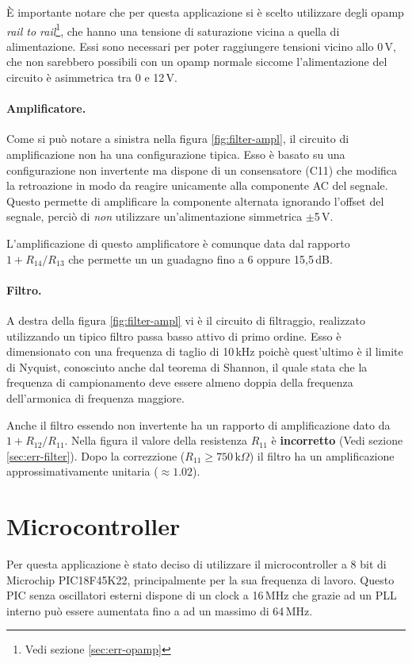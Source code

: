 \`E importante notare che per questa applicazione si \`e scelto utilizzare
degli opamp \emph{rail to rail}\footnote{Vedi sezione \ref{sec:err-opamp}},
che hanno una tensione di saturazione vicina a quella di alimentazione. Essi
sono necessari per poter raggiungere tensioni vicino allo 0\,V, che non
sarebbero possibili con un opamp normale siccome l'alimentazione del circuito
\`e asimmetrica tra 0 e 12\,V.

\paragraph{Amplificatore.} Come si pu\`o notare a sinistra nella figura
\ref{fig:filter-ampl}, il circuito di amplificazione non ha una configurazione
tipica. Esso \`e basato su una configurazione non invertente ma dispone di un
consensatore (C11) che modifica la retroazione in modo da reagire unicamente
alla componente AC del segnale. Questo permette di amplificare la componente
alternata ignorando l'offset del segnale, perci\`o di \emph{non} utilizzare
un'alimentazione simmetrica \(\pm\)5\,V.

L'amplificazione di questo amplificatore \`e comunque data dal rapporto
\(1+R_{14}/R_{13}\) che permette un un guadagno fino a 6 oppure 15,5\,dB.

\paragraph{Filtro.} A destra della figura \ref{fig:filter-ampl} vi \`e il
circuito di filtraggio, realizzato utilizzando un tipico filtro passa basso
attivo di primo ordine. Esso \`e dimensionato con una frequenza di taglio di
10\,kHz poich\`e quest'ultimo \`e il limite di Nyquist, conosciuto anche dal
teorema di Shannon, il quale stata che la frequenza di campionamento deve
essere almeno doppia della frequenza dell'armonica di frequenza maggiore.

Anche il filtro essendo non invertente ha un rapporto di amplificazione dato
da \(1+R_{12}/R_{11}\). Nella figura il valore della resistenza \(R_{11}\) \`e
\textbf{incorretto} (Vedi sezione \ref{sec:err-filter}). Dopo la correzzione
(\(R_{11} \geq 750\,\textrm{k}\Omega\)) il filtro ha un amplificazione
approssimativamente unitaria (\(\approx 1.02\)).

\section{Microcontroller}
Per questa applicazione \`e stato deciso di utilizzare il microcontroller a 8
bit di Microchip PIC18F45K22, principalmente per la sua frequenza di lavoro.
Questo PIC senza oscillatori esterni dispone di un clock a 16\,MHz che grazie
ad un PLL interno pu\`o essere aumentata fino a ad un massimo di 64\,MHz.

